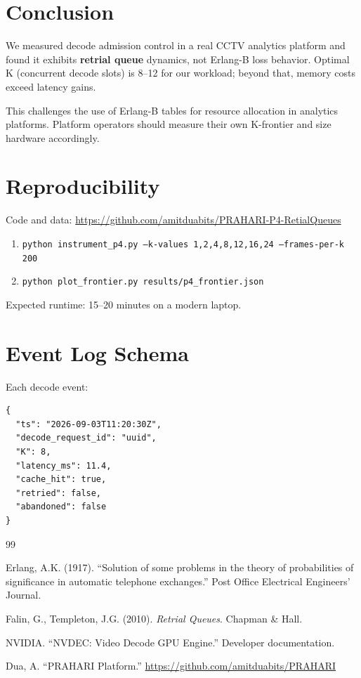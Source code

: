 \documentclass[sigconf,review]{acmart}
\begin{document}
\section{Conclusion}

We measured decode admission control in a real CCTV analytics platform and found it exhibits \textbf{retrial queue}
dynamics, not Erlang-B loss behavior. Optimal K (concurrent decode slots) is 8–12 for our workload; beyond that,
memory costs exceed latency gains.

This challenges the use of Erlang-B tables for resource allocation in analytics platforms. Platform operators should
measure their own K-frontier and size hardware accordingly.

\appendix

\section{Reproducibility}

Code and data: \url{https://github.com/amitduabits/PRAHARI-P4-RetialQueues}

\begin{enumerate}
  \item \texttt{python instrument\_p4.py --k-values 1,2,4,8,12,16,24 --frames-per-k 200}
  \item \texttt{python plot\_frontier.py results/p4\_frontier.json}
\end{enumerate}

Expected runtime: 15–20 minutes on a modern laptop.

\section{Event Log Schema}

Each decode event:
\begin{lstlisting}
{
  "ts": "2026-09-03T11:20:30Z",
  "decode_request_id": "uuid",
  "K": 8,
  "latency_ms": 11.4,
  "cache_hit": true,
  "retried": false,
  "abandoned": false
}
\end{lstlisting}

\begin{thebibliography}{99}

 Erlang, A.K. (1917). ``Solution of some problems in the theory of probabilities of significance in automatic telephone exchanges.'' Post Office Electrical Engineers' Journal.

 Falin, G., Templeton, J.G. (2010). \emph{Retrial Queues}. Chapman \& Hall.

 NVIDIA. ``NVDEC: Video Decode GPU Engine.'' Developer documentation.

 Dua, A. ``PRAHARI Platform.'' \url{https://github.com/amitduabits/PRAHARI}

\end{thebibliography}
\end{document}
